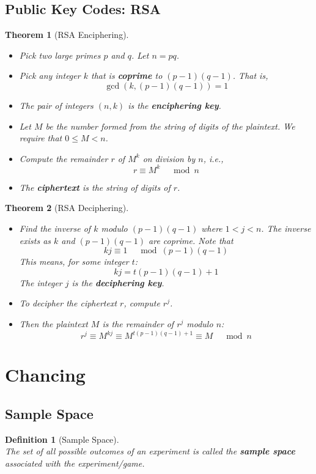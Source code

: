 \documentclass[12pt]{article}
\newtheorem{definition}{Definition}[section]
\newtheorem{theorem}{Theorem}[section]
\theoremstyle{definition}
\begin{document}
\subsection{Public Key Codes: RSA}
\begin{theorem}[RSA Enciphering]
\hfill\\\normalfont \begin{itemize}
\item Pick two large primes $p$ and $q$. Let $n=pq$.
\item Pick any integer $k$ that is \textbf{coprime} to $(p-1)(q-1)$. That is,
\[
\gcd(k, (p-1)(q-1))=1
\]
\item The pair of integers $(n,k)$ is the \textbf{enciphering key}.
\item Let $M$ be the number formed from the string of digits of the plaintext. We require that $0\leq M<n$.
\item Compute the remainder $r$ of $M^k$ on division by $n$, i.e.,
\[
r\equiv M^k\;\;\;\mod n
\]
\item The \textbf{ciphertext} is the string of digits of $r$.
\end{itemize}
\end{theorem}
\begin{theorem}[RSA Deciphering]
\hfill\\\normalfont \begin{itemize}
\item Find the inverse of $k$ modulo $(p-1)(q-1)$ where $1<j<n$. The inverse exists as $k$ and $(p-1)(q-1)$ are coprime. Note that
\[
kj\equiv 1\;\;\;\mod (p-1)(q-1)
\]
This means, for some integer $t$:
\[
kj=t(p-1)(q-1)+1
\]
The integer $j$ is the \textbf{deciphering key}.
\item To decipher the ciphertext $r$, compute $r^j$.
\item Then the plaintext $M$ is the remainder of $r^j$ modulo $n$:
\[
r^j\equiv M^{kj}\equiv M^{t(p-1)(q-1)+1}\equiv M\;\;\;\mod n
\]
\end{itemize}
\end{theorem}
\clearpage
\section{Chancing}
\subsection{Sample Space}
\begin{definition}[Sample Space]
\hfill\\\normalfont The set of all possible outcomes of an experiment is called the \textbf{sample space} associated with the experiment/game.
\end{definition}
\end{document}
